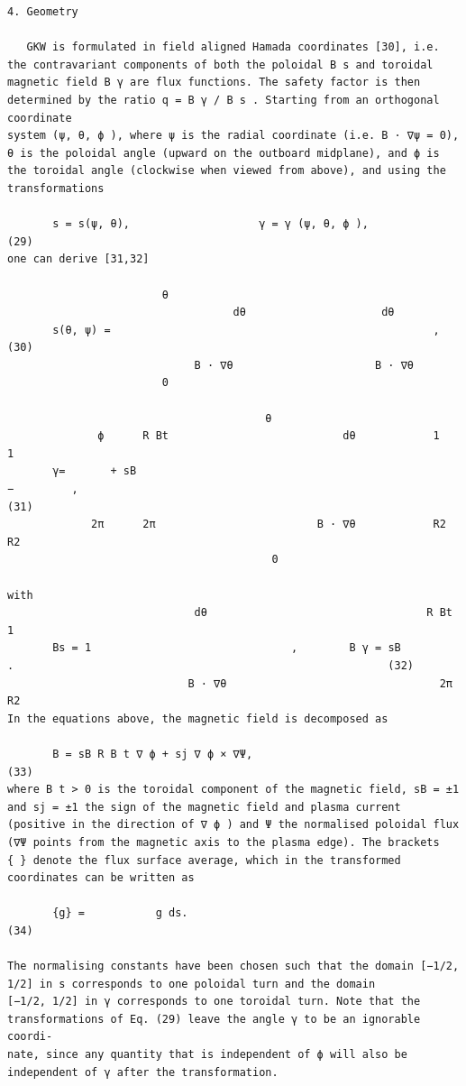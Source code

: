 \documentclass[a4paper]{article}
\newcommand{\gkwpagefont}{\fontsize{6.0pt}{7.55pt}\selectfont}
\begin{document}
\begin{Verbatim}[fontsize=\gkwpagefont]
4. Geometry

   GKW is formulated in field aligned Hamada coordinates [30], i.e. the contravariant components of both the poloidal B s and toroidal
magnetic field B γ are flux functions. The safety factor is then determined by the ratio q = B γ / B s . Starting from an orthogonal coordinate
system (ψ, θ, ϕ ), where ψ is the radial coordinate (i.e. B · ∇ψ = 0), θ is the poloidal angle (upward on the outboard midplane), and ϕ is
the toroidal angle (clockwise when viewed from above), and using the transformations

       s = s(ψ, θ),                    γ = γ (ψ, θ, ϕ ),                                                                                        (29)
one can derive [31,32]

                        θ                      
                                   dθ                     dθ
       s(θ, ψ) =                                                  ,                                                                             (30)
                             B · ∇θ                      B · ∇θ
                        0

                                        θ                                      
              ϕ      R Bt                           dθ            1         1
       γ=       + sB                                                    −         ,                                                             (31)
             2π      2π                         B · ∇θ            R2        R2
                                         0

with
                             dθ                                  R Bt     1
       Bs = 1                               ,        B γ = sB                        .                                                          (32)
                            B · ∇θ                                 2π       R2
In the equations above, the magnetic field is decomposed as

       B = sB R B t ∇ ϕ + sj ∇ ϕ × ∇Ψ,                                                                                                          (33)
where B t > 0 is the toroidal component of the magnetic field, sB = ±1 and sj = ±1 the sign of the magnetic field and plasma current
(positive in the direction of ∇ ϕ ) and Ψ the normalised poloidal flux (∇Ψ points from the magnetic axis to the plasma edge). The brackets
{ } denote the flux surface average, which in the transformed coordinates can be written as
               
       {g} =           g ds.                                                                                                                    (34)

The normalising constants have been chosen such that the domain [−1/2, 1/2] in s corresponds to one poloidal turn and the domain
[−1/2, 1/2] in γ corresponds to one toroidal turn. Note that the transformations of Eq. (29) leave the angle γ to be an ignorable coordi-
nate, since any quantity that is independent of ϕ will also be independent of γ after the transformation.
\end{Verbatim}
\end{document}
